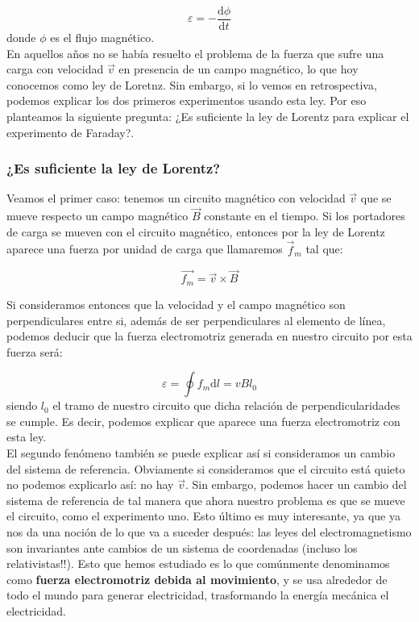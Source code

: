 \documentclass[12pt,a4paper]{article}
\newcommand{\D}{\mathrm{d}}
\begin{document}
\begin{equation}
\varepsilon = - \dfrac{\D \phi}{\D t}
\end{equation}
donde $\phi$ es el flujo magnético.\\

En aquellos años no se había resuelto el problema de la fuerza que sufre una carga con velocidad $\vec{v}$ en presencia de un campo magnético, lo que hoy conocemos como ley de Loretnz. Sin embargo, si lo vemos en retrospectiva, podemos explicar los dos primeros experimentos usando esta ley. Por eso planteamos la siguiente pregunta: ¿Es suficiente la ley de Lorentz para explicar el experimento de Faraday?.

\subsubsection{¿Es suficiente la ley de Lorentz?}

Veamos el primer caso: tenemos un circuito magnético con velocidad $\vec{v}$ que se mueve respecto un campo magnético $\vec{B}$ constante en el tiempo. Si los portadores de carga se mueven con el circuito magnético, entonces por la ley de Lorentz aparece una fuerza por unidad de carga que llamaremos $\vec{f}_m$ tal que:

$$
\vec{f_m} = \vec{v} \times \vec{B}
$$

Si consideramos entonces que la velocidad y el campo magnético son perpendiculares entre si, además de ser perpendiculares al elemento de línea, podemos deducir que la fuerza electromotriz generada en nuestro circuito por esta fuerza será:

$$
\varepsilon = \oint f_m \D l = v B  l_0
$$
siendo $l_0$ el tramo de nuestro circuito que dicha relación de perpendicularidades se cumple. Es decir, podemos explicar que aparece una fuerza electromotriz con esta ley. \\

El segundo fenómeno también se puede explicar así si consideramos un cambio del sistema de referencia. Obviamente si consideramos que el circuito está quieto no podemos explicarlo así: no hay $\vec{v}$. Sin embargo, podemos hacer un cambio del sistema de referencia de tal manera que ahora nuestro problema es que se mueve el circuito, como el experimento uno. Esto último es muy interesante, ya que ya nos da una noción de lo que va a suceder después: las leyes del electromagnetismo son invariantes ante cambios de un sistema de coordenadas (incluso los relativistas!!). Esto que hemos estudiado es lo que comúnmente denominamos como \textbf{fuerza electromotriz debida al movimiento}, y se usa alrededor de todo el mundo para generar electricidad, trasformando la energía mecánica el electricidad. \\
\end{document}
